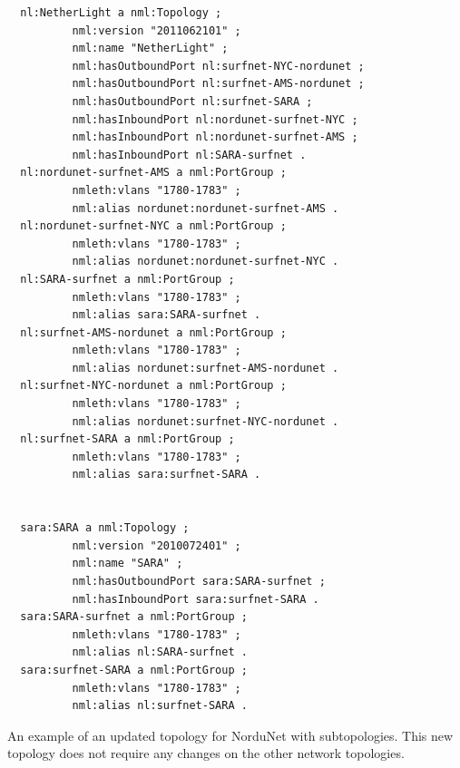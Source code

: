 \documentclass[12pt]{article}  %
\begin{document}
\begin{verbatim}
  nl:NetherLight a nml:Topology ;
          nml:version "2011062101" ;
          nml:name "NetherLight" ;
          nml:hasOutboundPort nl:surfnet-NYC-nordunet ;
          nml:hasOutboundPort nl:surfnet-AMS-nordunet ;
          nml:hasOutboundPort nl:surfnet-SARA ;
          nml:hasInboundPort nl:nordunet-surfnet-NYC ;
          nml:hasInboundPort nl:nordunet-surfnet-AMS ;
          nml:hasInboundPort nl:SARA-surfnet .
  nl:nordunet-surfnet-AMS a nml:PortGroup ;
          nmleth:vlans "1780-1783" ;
          nml:alias nordunet:nordunet-surfnet-AMS .
  nl:nordunet-surfnet-NYC a nml:PortGroup ;
          nmleth:vlans "1780-1783" ;
          nml:alias nordunet:nordunet-surfnet-NYC .
  nl:SARA-surfnet a nml:PortGroup ;
          nmleth:vlans "1780-1783" ;
          nml:alias sara:SARA-surfnet .
  nl:surfnet-AMS-nordunet a nml:PortGroup ;
          nmleth:vlans "1780-1783" ;
          nml:alias nordunet:surfnet-AMS-nordunet .
  nl:surfnet-NYC-nordunet a nml:PortGroup ;
          nmleth:vlans "1780-1783" ;
          nml:alias nordunet:surfnet-NYC-nordunet .
  nl:surfnet-SARA a nml:PortGroup ;
          nmleth:vlans "1780-1783" ;
          nml:alias sara:surfnet-SARA .


  sara:SARA a nml:Topology ;
          nml:version "2010072401" ;
          nml:name "SARA" ;
          nml:hasOutboundPort sara:SARA-surfnet ;
          nml:hasInboundPort sara:surfnet-SARA .
  sara:SARA-surfnet a nml:PortGroup ;
          nmleth:vlans "1780-1783" ;
          nml:alias nl:SARA-surfnet .
  sara:surfnet-SARA a nml:PortGroup ;
          nmleth:vlans "1780-1783" ;
          nml:alias nl:surfnet-SARA .
\end{verbatim}



 An example of an updated topology for NorduNet with subtopologies. 
This new topology does not require any changes on the other network topologies.
\end{document}
